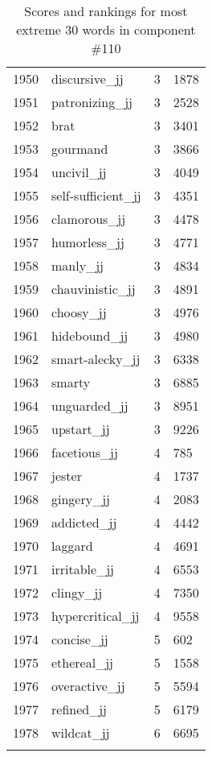 \begin{longtable}[!htbp]{| rlr@{.}l |}
    1950 & discursive\_jj & 3 & 1878 \\
    1951 & patronizing\_jj & 3 & 2528 \\
    1952 & brat & 3 & 3401 \\
    1953 & gourmand & 3 & 3866 \\
    1954 & uncivil\_jj & 3 & 4049 \\
    1955 & self-sufficient\_jj & 3 & 4351 \\
    1956 & clamorous\_jj & 3 & 4478 \\
    1957 & humorless\_jj & 3 & 4771 \\
    1958 & manly\_jj & 3 & 4834 \\
    1959 & chauvinistic\_jj & 3 & 4891 \\
    1960 & choosy\_jj & 3 & 4976 \\
    1961 & hidebound\_jj & 3 & 4980 \\
    1962 & smart-alecky\_jj & 3 & 6338 \\
    1963 & smarty & 3 & 6885 \\
    1964 & unguarded\_jj & 3 & 8951 \\
    1965 & upstart\_jj & 3 & 9226 \\
    1966 & facetious\_jj & 4 & 785 \\
    1967 & jester & 4 & 1737 \\
    1968 & gingery\_jj & 4 & 2083 \\
    1969 & addicted\_jj & 4 & 4442 \\
    1970 & laggard & 4 & 4691 \\
    1971 & irritable\_jj & 4 & 6553 \\
    1972 & clingy\_jj & 4 & 7350 \\
    1973 & hypercritical\_jj & 4 & 9558 \\
    1974 & concise\_jj & 5 & 602 \\
    1975 & ethereal\_jj & 5 & 1558 \\
    1976 & overactive\_jj & 5 & 5594 \\
    1977 & refined\_jj & 5 & 6179 \\
    1978 & wildcat\_jj & 6 & 6695 \\
    \hline
    \caption{Scores and rankings for most extreme 30 words in component \#110} \\
\end{longtable}
